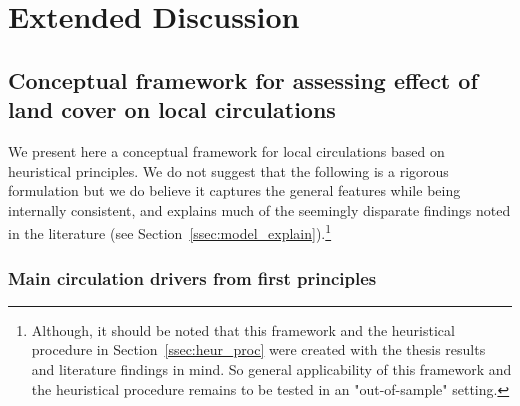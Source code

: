 \chapter{Extended Discussion}
\label{ch:discussion}

\section[Framework to assess land cover effect on circulations]{Conceptual framework for assessing effect of land cover on local circulations}
\label{sec:framework}

We present here a conceptual framework for local circulations based on heuristical principles. We do not suggest that the following is a rigorous formulation but we do believe it captures the general features while being internally consistent, and explains much of the seemingly disparate findings noted in the literature (see Section~\ref{ssec:model_explain}).\footnote{Although, it should be noted that this framework and the heuristical procedure in Section~\ref{ssec:heur_proc} were created with the thesis results and literature findings in mind. So general applicability of this framework and the heuristical procedure remains to be tested in an "out-of-sample" setting.}

\subsection{Main circulation drivers from first principles}
\label{ssec:drivers}

